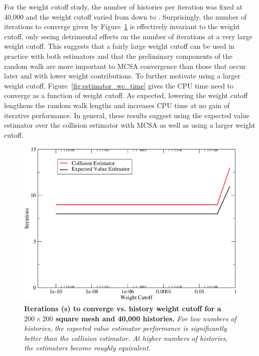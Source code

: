 For the weight cutoff study, the number of histories per iteration was
fixed at 40,000 and the weight cutoff varied from  down to
. Surprisingly, the number of iterations to converge given
by Figure~\ref{fig:estimator_wc_iters} is effectively invariant to the
weight cutoff, only seeing detrimental effects on the number of
iterations at a very large weight cutoff. This suggests that a fairly
large weight cutoff can be used in practice with both estimators and
that the preliminary components of the random walk are more important
to MCSA convergence than those that occur later and with lower weight
contributions. To further motivate using a larger weight cutoff,
Figure~\ref{fig:estimator_wc_time} gives the CPU time need to converge
as a function of weight cutoff. As expected, lowering the weight
cutoff lengthens the random walk lengths and increases CPU time at no
gain of iterative performance. In general, these results suggest using
the expected value estimator over the collision estimator with MCSA as
well as using a larger weight cutoff.

\begin{figure}[t!]
  \centering
  \includegraphics[width=5in,clip]{chapters/mc_background/estimator_wc_iters.pdf}
  \caption{\textbf{Iterations (s) to converge vs. history weight
      cutoff for a $200 \times 200$ square mesh and 40,000 histories.}
    \textit{For low numbers of histories, the expected value estimator
      performance is significantly better than the collision
      estimator. At higher numbers of histories, the estimators become
      roughly equivalent.}}
  \label{fig:estimator_wc_iters}
\end{figure}

